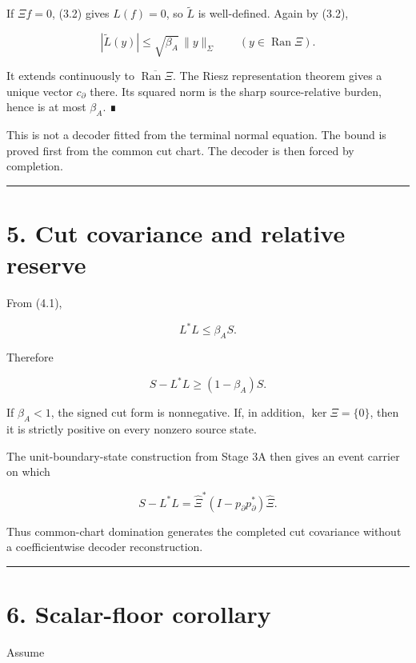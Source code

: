 If \(\Xi f=0\), (3.2) gives \(L(f)=0\), so \(\widetilde L\) is well-defined.
Again by (3.2),

\[
|\widetilde L(y)|
\le\sqrt{\beta_A}\,\|y\|_\Sigma
\qquad(y\in\operatorname{Ran}\Xi).
\]

It extends continuously to \(\overline{\operatorname{Ran}\Xi}\). The Riesz
representation theorem gives a unique vector \(c_\partial\) there. Its squared
norm is the sharp source-relative burden, hence is at most \(\beta_A\). ∎

This is not a decoder fitted from the terminal normal equation. The bound is
proved first from the common cut chart. The decoder is then forced by
completion.

\begin{center}\rule{0.5\linewidth}{0.5pt}\end{center}

\hypertarget{cut-covariance-and-relative-reserve}{%
\section{5. Cut covariance and relative reserve}\label{cut-covariance-and-relative-reserve}}

From (4.1),

\[
L^*L
\le
\beta_A S.
\]

Therefore

\[
\boxed{
S-L^*L
\ge
(1-\beta_A)S.
}
\tag{5.1}
\]

If \(\beta_A<1\), the signed cut form is nonnegative. If, in addition,
\(\ker\Xi=\{0\}\), then it is strictly positive on every nonzero source state.

The unit-boundary-state construction from Stage 3A then gives an event carrier
on which

\[
S-L^*L
=
\widehat\Xi^*(I-p_\partial p_\partial^*)\widehat\Xi.
\]

Thus common-chart domination generates the completed cut covariance without a
coefficientwise decoder reconstruction.

\begin{center}\rule{0.5\linewidth}{0.5pt}\end{center}

\hypertarget{scalar-floor-corollary}{%
\section{6. Scalar-floor corollary}\label{scalar-floor-corollary}}

Assume


